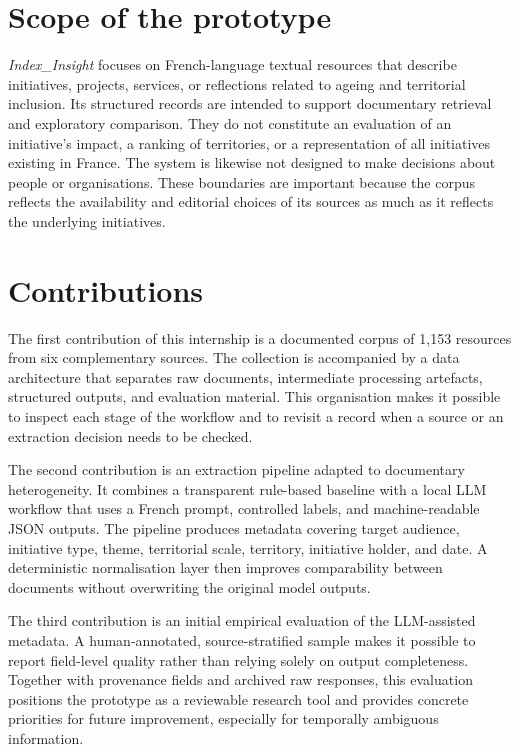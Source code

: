 \documentclass[
11pt,
english,
singlespacing,
headsepline,
]{MastersDoctoralThesis}
\begin{document}
\section{Scope of the prototype}

\textit{Index\_Insight} focuses on French-language textual resources that describe
initiatives, projects, services, or reflections related to ageing and territorial
inclusion. Its structured records are intended to support documentary retrieval and
exploratory comparison. They do not constitute an evaluation of an initiative's
impact, a ranking of territories, or a representation of all initiatives existing
in France. The system is likewise not designed to make decisions about people or
organisations. These boundaries are important because the corpus reflects the
availability and editorial choices of its sources as much as it reflects the
underlying initiatives.

\section{Contributions}

The first contribution of this internship is a documented corpus of 1,153
resources from six complementary sources. The collection is accompanied by a data
architecture that separates raw documents, intermediate processing artefacts,
structured outputs, and evaluation material. This organisation makes it possible
to inspect each stage of the workflow and to revisit a record when a source or an
extraction decision needs to be checked.

The second contribution is an extraction pipeline adapted to documentary
heterogeneity. It combines a transparent rule-based baseline with a local LLM
workflow that uses a French prompt, controlled labels, and machine-readable JSON
outputs. The pipeline produces metadata covering target audience, initiative type,
theme, territorial scale, territory, initiative holder, and date. A deterministic
normalisation layer then improves comparability between documents without
overwriting the original model outputs.

The third contribution is an initial empirical evaluation of the LLM-assisted
metadata. A human-annotated, source-stratified sample makes it possible to report
field-level quality rather than relying solely on output completeness. Together
with provenance fields and archived raw responses, this evaluation positions the
prototype as a reviewable research tool and provides concrete priorities for
future improvement, especially for temporally ambiguous information.
\end{document}
